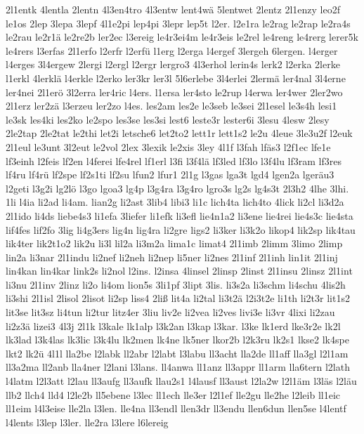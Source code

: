 {2l1entk
4lentla
2lentn
4l3en4tro
4l3entw
lent4wä
5lentwet
2lentz
2l1enzy
leo2f
le1os
2lep
3lepa
3lepf
4l1e2pi
lep4pi
3lepr
lep5t
l2er.
l2e1ra
le2rag
le2rap
le2ra4s
le2rau
le2r1ä
le2re2b
ler2ec
l3ereig
le4r3ei4m
le4r3eis
le2rel
le4reng
le4rerg
lerer5k
le4rers
l3erfas
2l1erfo
l2erfr
l2erfü
l1erg
l2erga
l4ergef
3lergeh
6lergen.
l4erger
l4erges
3l4ergew
2lergi
l2ergl
l2ergr
lergro3
4l3erhol
lerin4s
lerk2
l2erka
2lerke
l1erkl
4lerklä
l4erkle
l2erko
ler3kr
ler3l
5l6erlebe
3l4erlei
2lermä
ler4nal
3l4erne
ler4nei
2l1erö
3l2erra
ler4ric
l4ers.
l1ersa
ler4sto
le2rup
l4erwa
ler4wer
2ler2wo
2l1erz
ler2zä
l3erzeu
ler2zo
l4es.
les2am
les2e
le3seb
le3sei
2l1esel
le3s4h
lesi1
le3sk
les4ki
les2ko
le2spo
les3se
les3si
lest6
leste3r
lester6i
3lesu
4lesw
2lesy
2le2tap
2le2tat
le2thi
let2i
letsche6
let2to2
lett1r
lett1s2
le2u
4leue
3le3u2f
l2euk
2l1eul
le3unt
3l2eut
le2vol
2lex
3lexik
le2xis
3ley
4l1f
l3fah
lfäs3
l2f1ec
lfe1e
lf3einh
l2feis
lf2en
l4ferei
lfe4rel
lf1erl
l3fi
l3f4lä
lf3led
lf3lo
l3f4lu
lf3ram
lf3res
lf4ru
lf4rü
lf2spe
lf2s1ti
lf2su
lfun2
lfur1
2l1g
l3gas
lga3t
lgd4
lgen2a
lgeräu3
l2geti
l3g2i
lg2lö
l3go
lgoa3
lg4p
l3g4ra
l3g4ro
lgro3s
lg2s
lg4s3t
2l3h2
4lhe
3lhi.
1li
l4ia
li2ad
li4am.
lian2g
li2ast
3lib4
libi3
li1c
lich4ta
lich4to
4lick
li2cl
li3d2a
2l1ido
li4ds
liebe4s3
li1efa
3liefer
li1efk
li3efl
lie4n1a2
li3ene
lie4rei
lie4s3c
lie4sta
lif4fes
lif2fo
3lig
li4g3ers
lig4n
lig4ra
li2gre
ligs2
li3ker
li3k2o
likop4
lik2sp
lik4tau
lik4ter
lik2t1o2
lik2u
li3l
lil2a
li3m2a
lima1c
limat4
2l1imb
2limm
3limo
2limp
lin2a
li3nar
2l1indu
li2nef
li2neh
li2nep
li5ner
li2nes
2l1inf
2l1inh
lin1it
2l1inj
lin4kan
lin4kar
link2s
li2nol
l2ins.
l2insa
4linsel
2linsp
2linst
2l1insu
2linsz
2l1int
li3nu
2l1inv
2linz
li2o
li4om
lion5s
3li1pf
3lipt
3lis.
li3s2a
li3schm
li4schu
4lis2h
li3shi
2l1isl
2lisol
2lisot
li2sp
liss4
2liß
lit4a
li2tal
li3t2ä
l2i3t2e
li1th
li2t3r
lit1s2
lit3se
lit3sz
li4tun
li2tur
litz4er
3liu
liv2e
li2vea
li2ves
livi3e
li3vr
4lixi
li2zau
li2z3ä
lizei3
4l3j
2l1k
l3kale
lk1alp
l3k2an
l3kap
l3kar.
l3ke
lk1erd
lke3r2e
lk2l
lk3lad
l3k4las
lk3lic
l3k4lu
lk2men
lk4ne
lk5ner
lkor2b
l2k3ru
lk2s1
lkse2
lk4spe
lkt2
lk2ü
4l1l
lla2be
l2labk
ll2abr
l2labt
l3labu
ll3acht
lla2de
ll1aff
lla3gl
l2l1am
ll3a2ma
ll2anb
lla4ner
l2lani
l3lans.
ll4anwa
ll1anz
ll3appr
ll1arm
lla6tern
l2lath
l4latm
l2l3att
l2lau
ll3aufg
ll3aufk
llau2s1
l4lausf
ll3aust
l2la2w
l2l1äm
l3läs
l2läu
llb2
llch4
lld4
l2le2b
ll5ebene
l3lec
ll1ech
lle3er
l2l1ef
lle2gu
lle2he
l2leib
ll1eic
ll1eim
l4l3eise
lle2la
l3len.
lle4na
ll3endl
llen3dr
ll3endu
llen6dun
llen5se
l4lentf
l4lents
l3lep
l3ler.
lle2ra
l3lere
l6lereig
}
